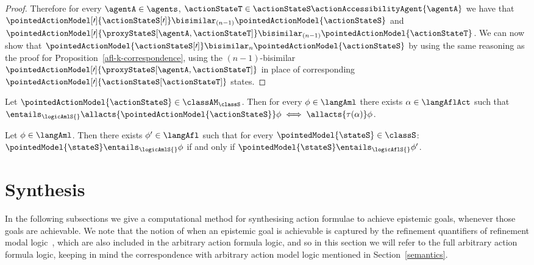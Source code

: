 \documentclass[twoside]{aiml14}
\begin{document}
\begin{proof}
      Therefore for every $\agentA \in \agents$, 
      $\actionStateT \in \actionStateS \actionAccessibilityAgent{\agentA}$
      we have that $\pointedActionModel[\prime]{\actionStateS[\prime]} \bisimilar_{(n - 1)} \pointedActionModel{\actionStateS}$
      and $\pointedActionModel[\prime]{\proxyStateS[\agentA,\actionStateT]} \bisimilar_{(n - 1)} \pointedActionModel{\actionStateT}$.
      We can now show that $\pointedActionModel{\actionStateS[\prime]} \bisimilar_n \pointedActionModel{\actionStateS}$ 
      by using the same reasoning as the proof for Proposition~\ref{afl-k-correspondence}, 
      using the $(n-1)$-bisimilar $\pointedActionModel[\prime]{\proxyStateS[\agentA,\actionStateT]}$ 
      in place of corresponding $\pointedActionModel[\prime]{\actionStateS[\actionStateT]}$ states.
  \end{proof}

  \begin{corollary}
      Let $\pointedActionModel{\actionStateS} \in \classAM_\classS$.
      Then for every $\phi \in \langAml$
      there exists $\alpha \in \langAflAct$ 
      such that $\entails_\logicAmlS{} \allacts{\pointedActionModel{\actionStateS}} \phi \iff \allacts{\tau(\alpha)} \phi$.
  \end{corollary}

  \begin{corollary}
      Let $\phi \in \langAml$. 
      Then there exists $\phi' \in \langAfl$ 
      such that for every $\pointedModel{\stateS} \in \classS$: 
      $\pointedModel{\stateS} \entails_\logicAmlS{} \phi$ if and only if
      $\pointedModel{\stateS} \entails_\logicAflS{} \phi'$.
  \end{corollary}

  \section{Synthesis}\label{synthesis}

  In the following subsections we give a computational method for synthesising
  action formulae to achieve epistemic goals, whenever those goals are
  achievable.  We note that the notion of when an epistemic goal is achievable
  is captured by the refinement quantifiers of refinement modal
  logic~\cite{vanditmarsch2009,bozzelli2012a}, which are also included in the
  arbitrary action formula logic, and so in this section we will refer to the full
  arbitrary action formula logic, keeping in mind the correspondence with 
  arbitrary action model logic mentioned in Section~\ref{semantics}.
\end{document}
